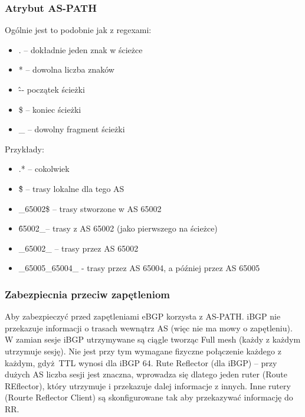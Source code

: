 \documentclass[a4paper, 12pt, titlepage]{article}
\begin{document}
			\subsubsection{Atrybut AS-PATH}
				Ogólnie jest to podobnie jak z regexami:
				\begin{itemize}
					\item . -- dokładnie jeden znak w ścieżce
					\item * -- dowolna liczba znaków
					\item \^ -- początek ścieżki
					\item \$ -- koniec ścieżki 
					\item \_ -- dowolny fragment ścieżki
				\end{itemize}
				Przykłady:
				\begin{itemize}
					\item .* -- cokolwiek
					\item \^\$ -- trasy lokalne dla tego AS
					\item \_65002\$ -- trasy stworzone w AS 65002
					\item \^65002\_-- trasy z AS 65002 (jako pierwszego na ścieżce)
					\item \_65002\_ -- trasy przez AS 65002
					\item \_65005\_65004\_ - trasy przez AS 65004, a później przez AS 65005
				\end{itemize}
			\subsubsection{Zabezpiecnia przeciw zapętleniom}
				Aby zabezpieczyć przed zapętleniami eBGP korzysta z AS-PATH. iBGP nie przekazuje informacji o trasach wewnątrz AS (więc nie ma mowy o zapętleniu). 
				\newline \newline
				W zamian sesje iBGP utrzymywane są ciągle tworząc Full mesh (każdy z każdym utrzymuje sesję). Nie jest przy tym wymagane fizyczne połączenie każdego z każdym, gdyż TTL wynosi dla iBGP 64.
				\newline \newline
				Rute Reflector (dla iBGP) -- przy dużych AS liczba sesji jest znaczna, wprowadza się dlatego jeden ruter (Route REflector), który utrzymuje i przekazuje dalej informacje z innych. Inne rutery (Rourte Reflector Client) są skonfigurowane tak aby przekazywać informację do RR.
\end{document}
